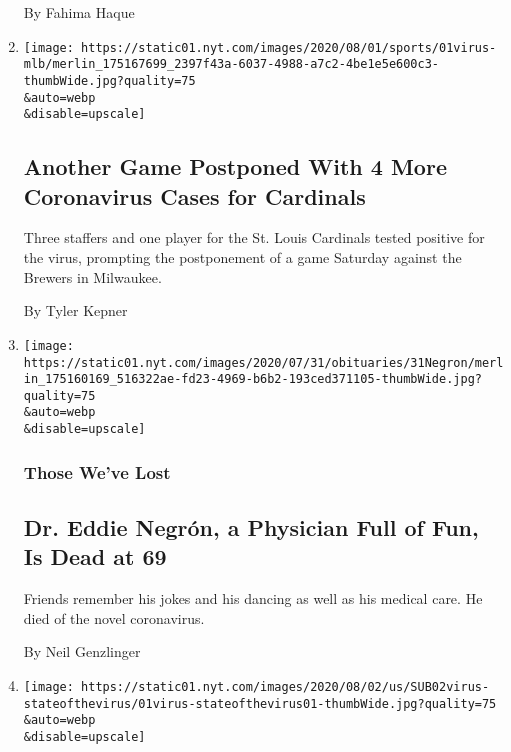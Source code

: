 \begin{enumerate}
  By Fahima Haque
\item
  \href{/2020/08/01/sports/baseball/coronavirus-cardinals.html}{}

  \texttt{[image: https://static01.nyt.com/images/2020/08/01/sports/01virus-mlb/merlin\_175167699\_2397f43a-6037-4988-a7c2-4be1e5e600c3-thumbWide.jpg?quality=75\\\&auto=webp\\\&disable=upscale]}

  \hypertarget{another-game-postponed-with-4-more-coronavirus-cases-for-cardinals}{%
  \subsection{Another Game Postponed With 4 More Coronavirus Cases for
  Cardinals}\label{another-game-postponed-with-4-more-coronavirus-cases-for-cardinals}}

  Three staffers and one player for the St. Louis Cardinals tested
  positive for the virus, prompting the postponement of a game Saturday
  against the Brewers in Milwaukee.

  By Tyler Kepner
\item
  \href{/2020/08/01/obituaries/eddie-negron-dead-coronavirus.html}{}

  \texttt{[image: https://static01.nyt.com/images/2020/07/31/obituaries/31Negron/merlin\_175160169\_516322ae-fd23-4969-b6b2-193ced371105-thumbWide.jpg?quality=75\\\&auto=webp\\\&disable=upscale]}

  \hypertarget{those-weve-lost}{%
  \subsubsection{Those We've Lost}\label{those-weve-lost}}

  \hypertarget{dr-eddie-negruxf3n-a-physician-full-of-fun-is-dead-at-69}{%
  \subsection{Dr. Eddie Negrón, a Physician Full of Fun, Is Dead at
  69}\label{dr-eddie-negruxf3n-a-physician-full-of-fun-is-dead-at-69}}

  Friends remember his jokes and his dancing as well as his medical
  care. He died of the novel coronavirus.

  By Neil Genzlinger
\item
  \href{/2020/08/01/us/coronavirus-midwest-cases-deaths.html}{}

  \texttt{[image: https://static01.nyt.com/images/2020/08/02/us/SUB02virus-stateofthevirus/01virus-stateofthevirus01-thumbWide.jpg?quality=75\\\&auto=webp\\\&disable=upscale]}


\end{enumerate}
